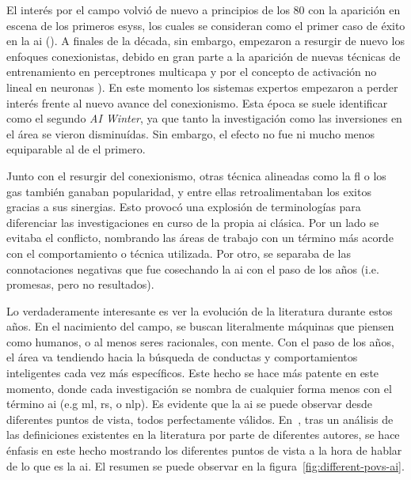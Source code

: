 El interés por el campo volvió de nuevo a principios de los $80$ con la aparición en escena de los primeros \glspl{esys}, los cuales se consideran como el primer caso de éxito en la \gls{ai} (\cite{russell2003artificial}). A finales de la década, sin embargo, empezaron a resurgir de nuevo los enfoques conexionistas, debido en gran parte a la aparición de nuevas técnicas de entrenamiento en perceptrones multicapa y por el concepto de activación no lineal en neuronas \cite{rumelhart1985learning, cybenko1989approximation}). En este momento los sistemas expertos empezaron a perder interés frente al nuevo avance del conexionismo. Esta época se suele identificar como el segundo \textit{AI Winter}, ya que tanto la investigación como las inversiones en el área se vieron disminuídas. Sin embargo, el efecto no fue ni mucho menos equiparable al de el primero.

Junto con el resurgir del conexionismo, otras técnica alineadas como la \gls{fl} o los \glspl{ga} también ganaban popularidad, y entre ellas retroalimentaban los exitos gracias a sus sinergias. Esto provocó una explosión de terminologías para diferenciar las investigaciones en curso de la propia \gls{ai} clásica. Por un lado se evitaba el conflicto, nombrando las áreas de trabajo con un término más acorde con el comportamiento o técnica utilizada. Por otro, se separaba de las connotaciones negativas que fue cosechando la \gls{ai} con el paso de los años (i.e. promesas, pero no resultados).

Lo verdaderamente interesante es ver la evolución de la literatura durante estos años. En el nacimiento del campo, se buscan literalmente máquinas que piensen como humanos, o al menos seres racionales, con mente. Con el paso de los años, el área va tendiendo hacia la búsqueda de conductas y comportamientos inteligentes cada vez más específicos. Este hecho se hace más patente en este momento, donde cada investigación se nombra de cualquier forma menos con el término \gls{ai} (e.g \gls{ml}, \gls{rs}, o \gls{nlp}). Es evidente que la \gls{ai} se puede observar desde diferentes puntos de vista, todos perfectamente válidos. En~\cite{russell2003artificial}, tras un análisis de las definiciones existentes en la literatura por parte de diferentes autores, se hace énfasis en este hecho mostrando los diferentes puntos de vista a la hora de hablar de lo que es la \gls{ai}. El resumen se puede observar en la figura~\ref{fig:different-povs-ai}.

